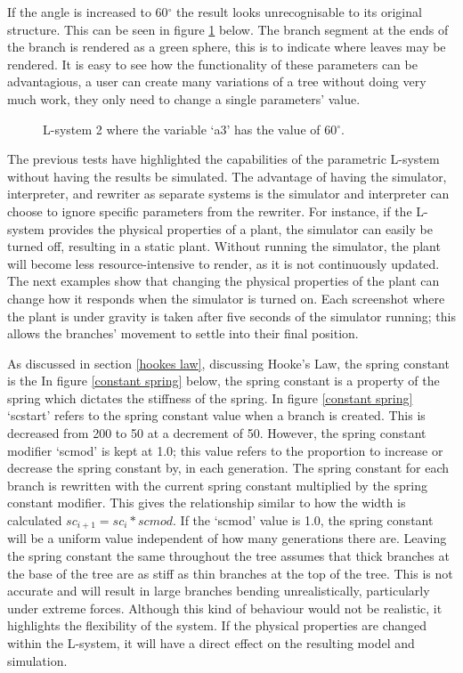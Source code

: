 \noindent
If the angle is increased to 60$^\circ$ the result looks unrecognisable to its original structure. This can be seen in figure \ref{extreme example angle} below. The branch segment at the ends of the branch is rendered as a green sphere, this is to indicate where leaves may be rendered. It is easy to see how the functionality of these parameters can be advantagious, a user can create many variations of a tree without doing very much work, they only need to change a single parameters' value. 

\begin{figure}[htbp]
	{\centering
		\setlength{\fboxrule}{1pt}
		\vspace{7px}
		\caption{L-system 2 where the variable `a3' has the value of 60$^\circ$. } \label{extreme example angle}
	}
\end{figure}
\FloatBarrier

\noindent
The previous tests have highlighted the capabilities of the parametric L-system without having the results be simulated. The advantage of having the simulator, interpreter, and rewriter as separate systems is the simulator and interpreter can choose to ignore specific parameters from the rewriter. For instance, if the L-system provides the physical properties of a plant, the simulator can easily be turned off, resulting in a static plant. Without running the simulator, the plant will become less resource-intensive to render, as it is not continuously updated. The next examples show that changing the physical properties of the plant can change how it responds when the simulator is turned on. Each screenshot where the plant is under gravity is taken after five seconds of the simulator running; this allows the branches' movement to settle into their final position.

As discussed in section \ref{hookes law}, discussing Hooke's Law, the spring constant is the In figure \ref{constant spring} below, the spring constant is a property of the spring which dictates the stiffness of the spring. In figure \ref{constant spring} `scstart' refers to the spring constant value when a branch is created. This is decreased from 200 to 50 at a decrement of 50. However, the spring constant modifier `scmod' is kept at 1.0; this value refers to the proportion to increase or decrease the spring constant by, in each generation. The spring constant for each branch is rewritten with the current spring constant multiplied by the spring constant modifier. This gives the relationship similar to how the width is calculated $sc_{i+1} = sc_i * scmod$. If the `scmod' value is 1.0, the spring constant will be a uniform value independent of how many generations there are. Leaving the spring constant the same throughout the tree assumes that thick branches at the base of the tree are as stiff as thin branches at the top of the tree. This is not accurate and will result in large branches bending unrealistically, particularly under extreme forces. Although this kind of behaviour would not be realistic, it highlights the flexibility of the system. If the physical properties are changed within the L-system, it will have a direct effect on the resulting model and simulation.

